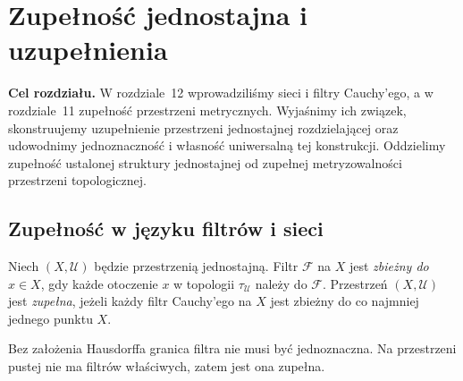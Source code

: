 \chapter{Zupełność jednostajna i uzupełnienia}
\label{ch:topog-uzupelnienia}

\noindent\textbf{Cel rozdziału.}
W rozdziale~12 wprowadziliśmy sieci i filtry Cauchy'ego,
a w rozdziale~11 zupełność przestrzeni metrycznych.
Wyjaśnimy ich związek, skonstruujemy uzupełnienie
przestrzeni jednostajnej rozdzielającej oraz
udowodnimy jednoznaczność i własność uniwersalną tej konstrukcji.
Oddzielimy zupełność ustalonej struktury jednostajnej
od zupełnej metryzowalności przestrzeni topologicznej.

\section{Zupełność w języku filtrów i sieci}
\label{sec:topog-uzupelnienia-definicje}

\begin{definicja}
\label{def:topog-uzupelnienia-zupelnosc}
Niech $(X,\mathcal U)$ będzie przestrzenią jednostajną.
Filtr $\mathcal F$ na $X$ jest \emph{zbieżny do $x\in X$},
gdy każde otoczenie $x$ w topologii $\tau_{\mathcal U}$
należy do $\mathcal F$.
Przestrzeń $(X,\mathcal U)$ jest \emph{zupełna},
jeżeli każdy filtr Cauchy'ego na $X$ jest zbieżny
do co najmniej jednego punktu $X$.
\end{definicja}

\begin{uwaga}
Bez założenia Hausdorffa granica filtra nie musi być
jednoznaczna. Na przestrzeni pustej nie ma filtrów
właściwych, zatem jest ona zupełna.
\end{uwaga}

